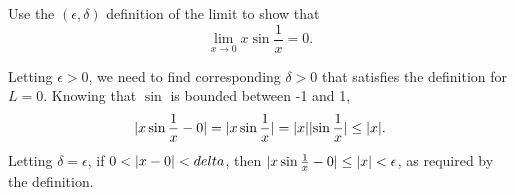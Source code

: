 \begin{example}
	Use the $(\epsilon, \delta)$ definition of the limit to show that
	\begin{equation*}
		\lim_{x\to 0}{x\sin{\frac{1}{x}}} = 0.
	\end{equation*}
\end{example}
Letting $\epsilon > 0$, we need to find corresponding $\delta > 0$ that satisfies the definition for $L = 0$.
Knowing that $\sin$ is bounded between -1 and 1,
\begin{equation*}
	\lvert x\sin{\frac{1}{x}} - 0 \rvert = \lvert x\sin{\frac{1}{x}} \rvert = \lvert x \rvert\lvert \sin{\frac{1}{x}} \rvert \leq \lvert x \rvert.
\end{equation*}
\indent
Letting $\delta = \epsilon$, if $0 < \lvert x - 0 \rvert < delta$, then $\lvert x\sin{\frac{1}{x}} - 0 \rvert \leq \lvert x \rvert < \epsilon$, as required by the definition.